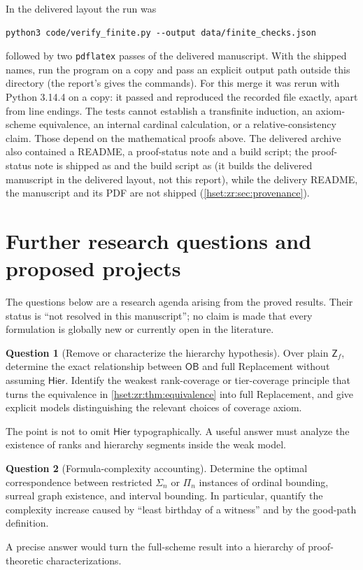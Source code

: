 \documentclass[11pt,letterpaper]{article}
\theoremstyle{definition}
\newtheorem{question}[question]{Question}\aliascntresetthe{question}
\theoremstyle{remark}
\newcommand{\Zf}{\mathsf{Z}_{\!f}}
\newcommand{\Hier}{\mathsf{Hier}}
\newcommand{\OB}{\mathsf{OB}}
\begin{document}
In the delivered layout the run was
\begin{verbatim}
python3 code/verify_finite.py --output data/finite_checks.json
\end{verbatim}
followed by two \texttt{pdflatex} passes of the delivered manuscript. With the
shipped names, run the program on a copy and pass an explicit output path
outside this directory (the report's  gives the commands). For
this merge it was rerun with Python 3.14.4 on a copy: it passed and reproduced
the recorded file exactly, apart from line endings.
The tests cannot establish a transfinite induction, an axiom-scheme equivalence, an internal cardinal calculation, or a relative-consistency claim. Those depend on the mathematical proofs above. The delivered archive also contained a README, a proof-status note and a build script; the proof-status note is shipped as  and the build script as  (it builds the delivered manuscript in the delivered layout, not this report), while the delivery README, the manuscript and its PDF are not shipped (\cref{hset:zr:sec:provenance}).

\section{Further research questions and proposed projects}
\label{hset:zr:sec:questions}
The questions below are a research agenda arising from the proved results. Their status is ``not resolved in this manuscript''; no claim is made that every formulation is globally new or currently open in the literature.

\begin{question}[Remove or characterize the hierarchy hypothesis]\label{hset:zr:q:hierarchy}
Over plain $\Zf$, determine the exact relationship between $\OB$ and full Replacement without assuming $\Hier$. Identify the weakest rank-coverage or tier-coverage principle that turns the equivalence in \cref{hset:zr:thm:equivalence} into full Replacement, and give explicit models distinguishing the relevant choices of coverage axiom.
\end{question}
The point is not to omit $\Hier$ typographically. A useful answer must analyze the existence of ranks and hierarchy segments inside the weak model.

\begin{question}[Formula-complexity accounting]\label{hset:zr:q:complexity}
Determine the optimal correspondence between restricted $\Sigma_n$ or $\Pi_n$ instances of ordinal bounding, surreal graph existence, and interval bounding. In particular, quantify the complexity increase caused by ``least birthday of a witness'' and by the good-path definition.
\end{question}
A precise answer would turn the full-scheme result into a hierarchy of proof-theoretic characterizations.
\end{document}
